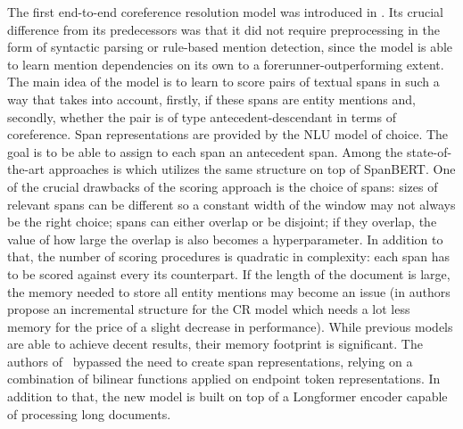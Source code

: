 The first end-to-end coreference resolution model was introduced in \cite{cr-Lee17}. Its crucial difference from its predecessors was that it did not require preprocessing in the form of syntactic parsing or rule-based mention detection, since the model is able to learn mention dependencies on its own to a forerunner-outperforming extent. 
The main idea of the model is to learn to score pairs of textual spans in such a way that takes into account, firstly, if these spans are entity mentions and, secondly, whether the pair is of type antecedent-descendant in terms of coreference.
Span representations are provided by the NLU model of choice. 
The goal is to be able to assign to each span an antecedent span. 
Among the state-of-the-art approaches is \cite{cr-Joshi2019} which utilizes the same structure on top of SpanBERT. 
One of the crucial drawbacks of the scoring approach is the choice of spans: sizes of relevant spans can be different so a constant width of the window may not always be the right choice; spans can either overlap or be disjoint; if they overlap, the value of how large the overlap is also becomes a hyperparameter. 
In addition to that, the number of scoring procedures is quadratic in complexity: each span has to be scored against every its counterpart. 
If the length of the document is large, the memory needed to store all entity mentions may become an issue (in \cite{cr-Xia2020} authors propose an incremental structure for the CR model which needs a lot less memory for the price of a slight decrease in performance).
While previous models are able to achieve decent results, their memory footprint is significant. 
The authors of~\cite{Kirstain2021S2E} bypassed the need to create span representations, relying on a combination of bilinear functions applied on endpoint token representations. 
In addition to that, the new model is built on top of a Longformer encoder capable of processing long documents. 

